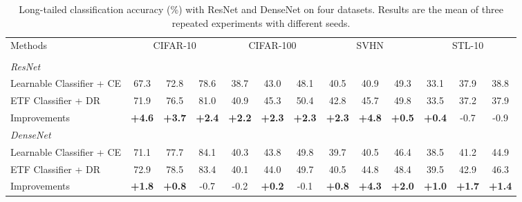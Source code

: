 \documentclass{article}
\newcommand{\<}{\left\langle}
\renewcommand{\>}{\right\rangle}
\begin{document}
\begin{table*}[t]
	\vspace{-3mm}
	\small
			\renewcommand\arraystretch{0.8}
	\setlength{\tabcolsep}{2.5pt}
	\caption{Long-tailed classification accuracy (\%) with ResNet and DenseNet on four datasets. Results are the mean of three repeated experiments with different seeds.} \label{longtail}
	\vspace{-1mm}
	\begin{center}
\begin{tabular}{l|ccc|ccc|ccc|ccc}
				\toprule
				\multirow{2}{*}{Methods} & \multicolumn{3}{c|}{CIFAR-10 \cite{krizhevsky2009learning}} &  \multicolumn{3}{c|}{CIFAR-100 \cite{krizhevsky2009learning}} & \multicolumn{3}{c|}{SVHN \cite{netzer2011reading}} & \multicolumn{3}{c}{STL-10 \cite{coates2011analysis}}\\
				&   &  &  &  &  &  &  &  &  &  &  &  \\
				\midrule
				\emph{ResNet} \\
				Learnable Classifier + CE  & 67.3 & 72.8 & 78.6 & 38.7& 43.0 & 48.1 & 40.5&40.9 & 49.3& 33.1&37.9&38.8 \\
				ETF Classifier +  DR   & 71.9 & 76.5 & 81.0 & 40.9 & 45.3 & 50.4 & 42.8 & 45.7 & 49.8 & 33.5 & 37.2 & 37.9 \\
				\rowcolor{lightgray}  Improvements  & \textbf{+4.6} & \textbf{+3.7} & \textbf{+2.4} & \textbf{+2.2} & \textbf{+2.3} & \textbf{+2.3} & \textbf{+2.3} & \textbf{+4.8} & \textbf{+0.5} & \textbf{+0.4} & -0.7 & -0.9\\
				\midrule
				\emph{DenseNet} \\
Learnable Classifier + CE  & 71.1 & 77.7 & 84.1 & 40.3 & 43.8 & 49.8 & 39.7 & 40.5 & 46.4& 38.5 & 41.2 & 44.9\\
                ETF Classifier +  DR   & 72.9 & 78.5 & 83.4 & 40.1 & 44.0 & 49.7 & 40.5 & 44.8 & 48.4 & 39.5 & 42.9 & 46.3 \\				
				\rowcolor{lightgray} Improvements  & \textbf{+1.8} & \textbf{+0.8} & -0.7 & -0.2 & \textbf{+0.2} & -0.1 & \textbf{+0.8}  & \textbf{+4.3}  & \textbf{+2.0}  & \textbf{+1.0} & \textbf{+1.7} & \textbf{+1.4} \\				
				\bottomrule
			\end{tabular}
\end{center}
	\vspace{-2mm}
\end{table*}
\end{document}
